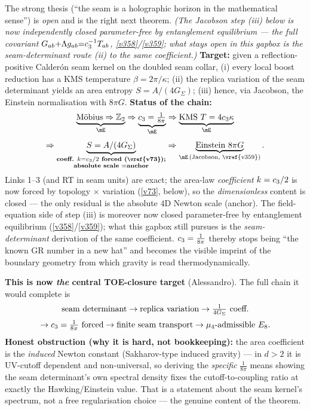 \begin{gapbox}
The strong thesis (``the seam is a holographic horizon in the mathematical sense'') is \emph{open} and is
the right next theorem. \emph{(The Jacobson step (iii) below is now independently closed parameter-free by
entanglement equilibrium --- the full covariant $G_{ab}{+}\Lambda g_{ab}{=}c_3^{-1}T_{ab}$,
\vref{v358}/\vref{v359}; what stays open in \emph{this} gapbox is the \emph{seam-determinant} route (ii) to the
same coefficient.)} \textbf{Target:} given a reflection-positive Calder\'on seam kernel on the doubled
seam collar, (i) every local boost reduction has a KMS temperature $\beta=2\pi/\kappa$; (ii) the replica
variation of the seam determinant yields an area entropy $S=A/(4G_\Sigma)$; (iii) hence, via Jacobson, the
Einstein normalisation with $8\pi G$. \textbf{Status of the chain:}
\[
  \begin{gathered}
  \underbrace{\text{M\"obius}\Rightarrow\Z_2}_{\mE}\Rightarrow
  \underbrace{\cthree=\tfrac1{8\pi}}_{\mE}\Rightarrow
  \underbrace{\text{KMS }T=4\cthree\kappa}_{\mE}\\[3pt]
  \Rightarrow
  \underbrace{S=A/(4G_\Sigma)}_{\substack{\textbf{coeff. }k=\cthree/2\textbf{ forced (\vref{v73});}\\\textbf{absolute scale }=\textbf{anchor}}}\Rightarrow
  \underbrace{\text{Einstein }8\pi G}_{\mE\,(\text{Jacobson, \vref{v359}})}.
  \end{gathered}
\]
Links 1--3 (and RT in seam units) are exact; the area-law \emph{coefficient} $k=c_3/2$ is now forced by
topology $\times$ variation (\vref{v73}, below), so the \emph{dimensionless} content is closed --- the only residual
is the absolute $4$D Newton scale (anchor). The field-equation side of step (iii) is moreover now closed
parameter-free by entanglement equilibrium (\vref{v358}/\vref{v359}); what this gapbox still pursues is the
\emph{seam-determinant} derivation of the same coefficient. $c_3=\tfrac1{8\pi}$ thereby stops being ``the known GR number
in a new hat'' and becomes the visible imprint of the boundary geometry from which gravity is read
thermodynamically.

\smallskip\noindent\textbf{This is now \emph{the} central TOE-closure target} (Alessandro). The full chain it
would complete is
\[
  \begin{gathered}
  \text{seam determinant}\to\text{replica variation}\to\tfrac1{4G_\Sigma}\ \text{coeff.}\\[2pt]
  \to c_3=\tfrac1{8\pi}\ \text{forced}\to\text{finite seam transport}\to\mu_4\text{-admissible }E_8.
  \end{gathered}
\]
\textbf{Honest obstruction (why it is hard, not bookkeeping):} the area coefficient is the \emph{induced}
Newton constant (Sakharov-type induced gravity) --- in $d>2$ it is UV-cutoff dependent and non-universal, so
deriving the \emph{specific} $\tfrac1{8\pi}$ means showing the seam determinant's own spectral density fixes
the cutoff-to-coupling ratio at exactly the Hawking/Einstein value. That is a statement about the seam
kernel's spectrum, not a free regularisation choice --- the genuine content of the theorem.


\end{gapbox}
